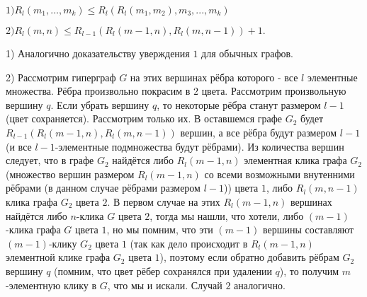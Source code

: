 \Statement

$1) R_l(m_1, \ldots, m_k) \leqslant R_l(R_l(m_1, m_2), m_3, ..., m_k)$

$2) R_l(m, n) \leqslant R_{l-1}(R_l(m-1, n), R_l(m, n-1)) + 1.$

\Def

1) Аналогично доказательству уверждения $1$ для обычных графов.

2) Рассмотрим гиперграф $G$ на этих вершинах рёбра которого - все $l$ элементные множества. Рёбра произвольно покрасим в $2$ цвета. Рассмотрим произвольную вершину $q$. Если убрать вершину $q$, то некоторые рёбра станут размером $l-1$ (цвет сохраняется). Рассмотрим только их. В оставшемся графе $G_2$ будет $R_{l-1}(R_l(m-1, n), R_l(m, n-1))$ вершин, а все рёбра будут размером $l-1$ (и все $l-1$-элементные подмножества будут рёбрами). Из количества вершин следует, что в графе $G_2$ найдётся либо $R_l(m-1, n)$ элементная клика графа $G_2$ (множество вершин размером $R_l(m-1, n)$ со всеми возможными внутенними рёбрами (в данном случае рёбрами размером $l-1$)) цвета $1$, либо $R_l(m, n-1)$ клика графа $G_2$ цвета $2$. В первом случае на этих $R_l(m-1, n)$ вершинах найдётся либо $n$-клика $G$ цвета $2$, тогда мы нашли, что хотели, либо $(m-1)$-клика графа $G$ цвета $1$, но мы помним, что эти $(m-1)$ вершины составляют $(m-1)$-клику $G_2$ цвета $1$ (так как дело происходит в $R_l(m-1, n)$ элементной клике графа $G_2$ цвета $1$), поэтому если обратно добавить рёбрам $G_2$ вершину $q$ (помним, что цвет рёбер сохранялся при удалении $q$), то получим $m$-элементную клику в $G$, что мы и искали. Случай $2$ аналогично. \EndProof
